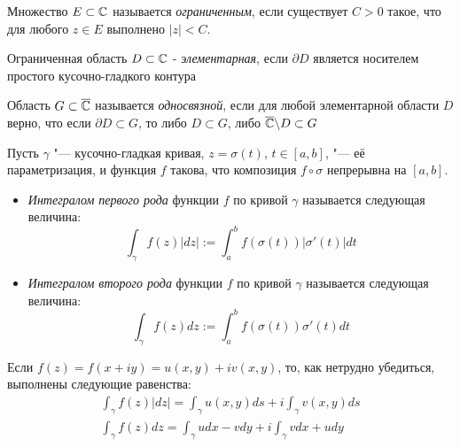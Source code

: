\begin{definition}
	Множество $E \subset \mathbb{C}$ называется \textit{ограниченным}, если существует $C > 0$ такое, что для любого $z \in E$ выполнено $|z| < C$.
\end{definition}
\begin{definition} Ограниченная область $D \subset \mathbb{C}$ - \textit{элементарная}, если $\partial D$ является носителем простого кусочно-гладкого контура
\end{definition}
\begin{definition}
	Область $G \subset \overline {\mathbb{C}}$ называется \textit{односвязной}, если для любой элементарной области $D$ верно, что если $\partial D \subset G$, то либо $D \subset G$, либо $\overline{\mathbb{C}} \backslash D \subset G$ 
\end{definition}
\begin{definition}
	Пусть $\gamma$ "--- кусочно-гладкая кривая, $z = \sigma(t)$, $t \in [a, b]$, "--- её параметризация, и функция $f$ такова, что композиция $f\circ\sigma$ непрерывна на $[a, b]$.
	\begin{itemize}
		\item \textit{Интегралом первого рода} функции $f$ по кривой $\gamma$ называется следующая величина:
		\[\int_{\gamma}f(z)|dz| := \int_a^bf(\sigma(t))|\sigma'(t)|dt\]
		\item \textit{Интегралом второго рода} функции $f$ по кривой $\gamma$ называется следующая величина:
		\[\int_{\gamma}f(z)dz := \int_a^bf(\sigma(t))\sigma'(t)dt\]
	\end{itemize}
\end{definition}

\begin{note}
	Если $f(z) = f(x + iy) = u(x, y) + iv(x, y)$, то, как нетрудно убедиться, выполнены следующие равенства:
	\begin{gather*}
		\int_{\gamma}f(z)|dz| = \int_\gamma u(x, y)ds + i\int_\gamma v(x, y)ds
		\\
		\int_{\gamma}f(z)dz = \int_\gamma udx - vdy + i\int_\gamma vdx + udy
	\end{gather*}
\end{note}

